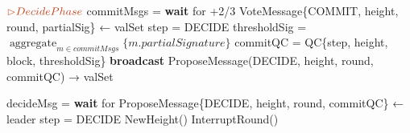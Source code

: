\documentclass[a4paper]{article}
\DeclareMathOperator*{\aggregate}{aggregate}
\begin{document}
\begin{algorithm}
\begin{algorithmic}
        \newline ${\color{Bittersweet} {\rhd Decide Phase}}$
          \State commitMsgs = \textbf{wait} for {+2/3} VoteMessage\{\textsc{COMMIT}, height, round, partialSig\} ← valSet
          \State step = DECIDE
          \State thresholdSig = ${\aggregate_{m \in commitMsgs} \{m.partialSignature\}}$
          \State commitQC = QC\{step, height, block, thresholdSig\}
          \State \textbf{broadcast} ProposeMessage(DECIDE, height, round, commitQC) → valSet

        \Else \quad {\color{Gray} { // IsReplica}}
            \State decideMsg = \textbf{wait} for ProposeMessage\{DECIDE, height, round, commitQC\} ← leader
            \State step = DECIDE
                \State NewHeight()
            \Else
                \State InterruptRound()
          \EndIf
        \EndIf
      \EndFor
      \State
  \end{algorithmic}
\end{algorithm}
\end{document}
